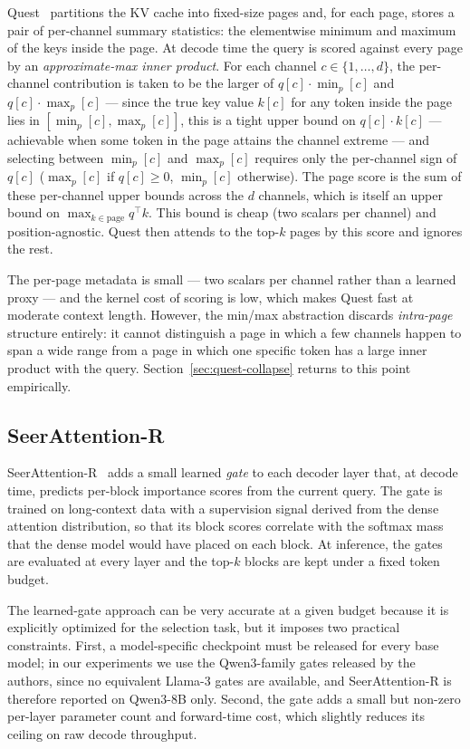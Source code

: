 Quest~\cite{tang2024quest} partitions the KV cache into fixed-size
pages and, for each page, stores a pair of per-channel summary
statistics: the elementwise minimum and maximum of the keys inside
the page.  At decode time the query is scored against every page by an
\emph{approximate-max inner product}.  For each channel
$c \in \{1, \dots, d\}$, the per-channel contribution is taken to be
the larger of $q[c] \cdot \min_p[c]$ and $q[c] \cdot \max_p[c]$ ---
since the true key value $k[c]$ for any token inside the page lies in
$[\min_p[c], \max_p[c]]$, this is a tight upper bound on
$q[c] \cdot k[c]$ --- achievable when some token in the page attains
the channel extreme --- and selecting between $\min_p[c]$ and
$\max_p[c]$ requires only the per-channel sign of $q[c]$ ($\max_p[c]$
if $q[c] \ge 0$, $\min_p[c]$ otherwise).
The page score is the sum of these per-channel upper bounds across
the $d$ channels, which is itself an upper bound on
$\max_{k \in \text{page}} q^{\top} k$.  This bound is cheap (two
scalars per channel) and position-agnostic.  Quest then attends to the
top-$k$ pages by this score and ignores the rest.

The per-page metadata is small --- two scalars per channel rather
than a learned proxy --- and the kernel cost of scoring is low, which
makes Quest fast at moderate context length.  However, the min/max
abstraction discards \emph{intra-page} structure entirely: it cannot
distinguish a page in which a few channels happen to span a wide
range from a page in which one specific token has a large inner
product with the query.  Section~\ref{sec:quest-collapse} returns to
this point empirically.

\subsection{SeerAttention-R}\label{sec:rel-seer}

SeerAttention-R~\cite{gao2025seerattention} adds a small learned
\emph{gate} to each decoder layer that, at decode time, predicts
per-block importance scores from the current query.  The gate is
trained on long-context data with a supervision signal derived from
the dense attention distribution, so that its block scores correlate
with the softmax mass that the dense model would have placed on each
block.  At inference, the gates are evaluated at every layer and the
top-$k$ blocks are kept under a fixed token budget.

The learned-gate approach can be very accurate at a given budget
because it is explicitly optimized for the selection task, but it
imposes two practical constraints.  First, a model-specific
checkpoint must be released for every base model; in our experiments
we use the Qwen3-family gates released by the authors, since no
equivalent Llama-3 gates are available, and SeerAttention-R is
therefore reported on Qwen3-8B only.  Second, the gate adds a small
but non-zero per-layer parameter count and forward-time cost, which
slightly reduces its ceiling on raw decode throughput.

